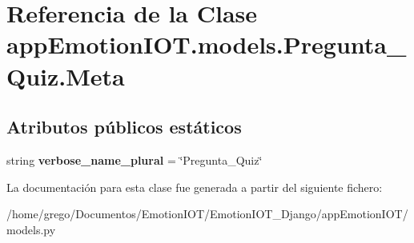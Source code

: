 \hypertarget{classappEmotionIOT_1_1models_1_1Pregunta__Quiz_1_1Meta}{}\section{Referencia de la Clase app\+Emotion\+I\+O\+T.\+models.\+Pregunta\+\_\+\+Quiz.\+Meta}
\label{classappEmotionIOT_1_1models_1_1Pregunta__Quiz_1_1Meta}
\subsection*{Atributos públicos estáticos}
\begin{DoxyCompactItemize}
\item 
string {\bfseries verbose\+\_\+name\+\_\+plural} = \char`\"{}Pregunta\+\_\+\+Quiz\char`\"{}\hypertarget{classappEmotionIOT_1_1models_1_1Pregunta__Quiz_1_1Meta_a89f38748be8e838e8262415da4cba611}{}\label{classappEmotionIOT_1_1models_1_1Pregunta__Quiz_1_1Meta_a89f38748be8e838e8262415da4cba611}

\end{DoxyCompactItemize}


La documentación para esta clase fue generada a partir del siguiente fichero\+:\begin{DoxyCompactItemize}
\item 
/home/grego/\+Documentos/\+Emotion\+I\+O\+T/\+Emotion\+I\+O\+T\+\_\+\+Django/app\+Emotion\+I\+O\+T/models.\+py\end{DoxyCompactItemize}
